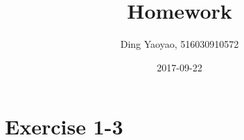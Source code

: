 \documentclass{article}
\title{Homework}
\date{2017-09-22}
\author{Ding Yaoyao, 516030910572}
\begin{document}
	\maketitle

	\section*{Exercise 1-3}
\end{document}
